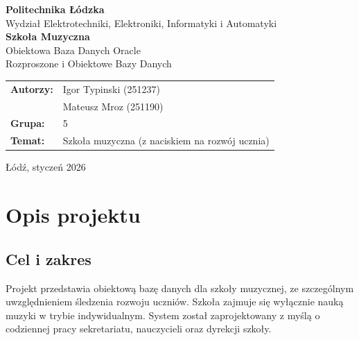 \documentclass[12pt,a4paper]{article}
\begin{document}
\begin{titlepage}
    \centering
    \vspace*{1cm}

    \Large\textbf{Politechnika Łódzka}\\[0.3cm]
    {\large Wydział Elektrotechniki, Elektroniki, Informatyki i Automatyki}\\[2cm]

    {\Huge\textbf{Szkoła Muzyczna}}\\[0.5cm]
    {\Large Obiektowa Baza Danych Oracle}\\[1cm]

    {\large Rozproszone i Obiektowe Bazy Danych}\\[3cm]

    \begin{tabular}{ll}
        \textbf{Autorzy:} & Igor Typinski (251237) \\
                          & Mateusz Mroz (251190) \\[0.5cm]
        \textbf{Grupa:}   & 5 \\[0.5cm]
        \textbf{Temat:}   & Szkoła muzyczna (z naciskiem na rozwój ucznia)
    \end{tabular}

    \vfill
    {\large Łódź, styczeń 2026}
\end{titlepage}

\tableofcontents
\newpage

\section{Opis projektu}

\subsection{Cel i zakres}

Projekt przedstawia obiektową bazę danych dla szkoły muzycznej, ze szczególnym uwzględnieniem śledzenia rozwoju uczniów. Szkoła zajmuje się wyłącznie nauką muzyki w trybie indywidualnym. System został zaprojektowany z myślą o codziennej pracy sekretariatu, nauczycieli oraz dyrekcji szkoły.
\end{document}
